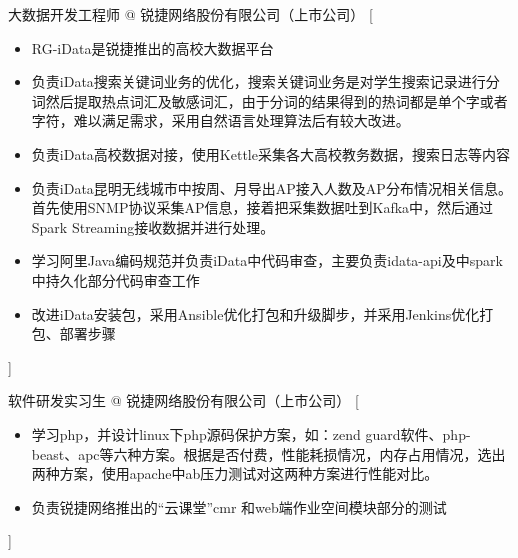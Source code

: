\documentclass[zh]{resume}
\begin{document}
\begin{experiences}
    {大数据开发工程师 @ 锐捷网络股份有限公司（上市公司）}%
    [\begin{itemize}
      \item RG-iData是锐捷推出的高校大数据平台
      \item 负责iData搜索关键词业务的优化，搜索关键词业务是对学生搜索记录进行分词然后提取热点词汇及敏感词汇，由于分词的结果得到的热词都是单个字或者字符，难以满足需求，采用自然语言处理算法后有较大改进。
      \item 负责iData高校数据对接，使用Kettle采集各大高校教务数据，搜索日志等内容
      \item 负责iData昆明无线城市中按周、月导出AP接入人数及AP分布情况相关信息。首先使用SNMP协议采集AP信息，接着把采集数据吐到Kafka中，然后通过Spark Streaming接收数据并进行处理。
      \item 学习阿里Java编码规范并负责iData中代码审查，主要负责idata-api及中spark中持久化部分代码审查工作
      \item  改进iData安装包，采用Ansible优化打包和升级脚步，并采用Jenkins优化打包、部署步骤
    \end{itemize}]

  \separator{0.5ex}
    {软件研发实习生 @ 锐捷网络股份有限公司（上市公司）}%
    [\begin{itemize}
      \item 学习php，并设计linux下php源码保护方案，如：zend guard软件、php-beast、apc等六种方案。根据是否付费，性能耗损情况，内存占用情况，选出两种方案，使用apache中ab压力测试对这两种方案进行性能对比。
      \item 负责锐捷网络推出的“云课堂”cmr 和web端作业空间模块部分的测试
    \end{itemize}]
\end{experiences}
\end{document}
